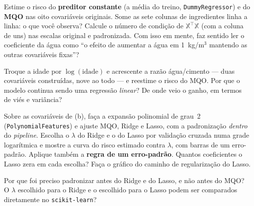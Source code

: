 \documentclass[11pt,a4paper]{article}
\newcommand{\cod}[1]{\texttt{#1}}
\begin{document}
\begin{itens}
  \item Estime o risco do \textbf{preditor constante} (a média do treino,
        \cod{DummyRegressor}) e do \textbf{MQO} nas oito covariáveis originais. Some
        as sete colunas de ingredientes linha a linha: o que você observa? Calcule o
        número de condição de $\mathbb{X}^\top\mathbb{X}$ (com a coluna de uns) nas
        escalas original e padronizada. Com isso em mente, faz sentido ler o
        coeficiente da água como ``o efeito de aumentar a água em 1~kg/m$^3$
        mantendo as outras covariáveis fixas''?
  \item Troque a idade por $\log(\text{idade})$ e acrescente a razão água/cimento ---
        duas covariáveis construídas, nove ao todo --- e reestime o risco do MQO. Por
        que o modelo
        continua sendo uma regressão \emph{linear}? De onde veio o ganho, em termos
        de viés e variância?
  \item Sobre as covariáveis de (b), faça a expansão polinomial de grau~2
        (\cod{PolynomialFeatures}) e ajuste MQO, Ridge e Lasso, com a padronização
        \emph{dentro} do \emph{pipeline}. Escolha o $\lambda$ do Ridge e o do Lasso por
        validação cruzada numa grade logarítmica e mostre a curva do risco estimado contra
        $\lambda$, com barras de um erro-padrão. Aplique também a \textbf{regra de um
        erro-padrão}. Quantos coeficientes o Lasso zera em cada escolha? Faça o
        gráfico do caminho de regularização do Lasso.
  \item Por que foi preciso padronizar antes do Ridge e do Lasso, e não antes do
        MQO? O $\lambda$ escolhido para o Ridge e o escolhido para o Lasso podem ser
        comparados diretamente no \cod{scikit-learn}?
\end{itens}
\end{document}

